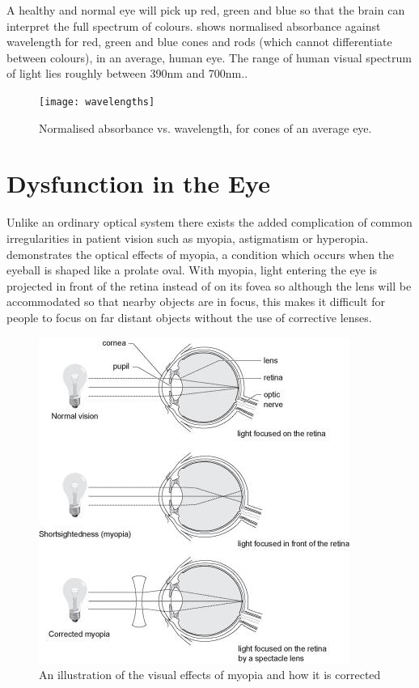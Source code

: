 A healthy and normal eye will pick up red, green and blue so that the
brain can interpret the full spectrum of colours. 
shows normalised absorbance against wavelength for red, green and
blue cones and rods (which cannot differentiate between colours), in an
average, human eye. The range of human visual spectrum of light lies
roughly between 390nm and 700nm.\cite{starr2010biology}.

\begin{figure}[!htbp]
\centering
  \texttt{[image: wavelengths]}
\caption{Normalised absorbance vs. wavelength, for cones of an average eye.\cite{wikicones}}
\label{fig:wavelengths}
\end{figure}

\section{Dysfunction in the Eye}

Unlike an ordinary optical system there exists the added complication
of common irregularities in patient vision such as myopia, astigmatism
or hyperopia.  demonstrates the optical effects of myopia,
a condition which occurs when the eyeball is shaped like a prolate oval.
\cite{saine2002ophthalmic} With myopia, light entering the eye is projected
in front of the retina instead of on its fovea so although the lens will be
accommodated so that nearby objects are in focus, this makes it difficult
for people to focus on far distant objects without the use of corrective
lenses.

\begin{figure}[htbp]
\centering
\includegraphics{figures/myopia}
\caption{An illustration of the visual effects of myopia and how it is corrected}
\label{fig:myop}
\end{figure}

